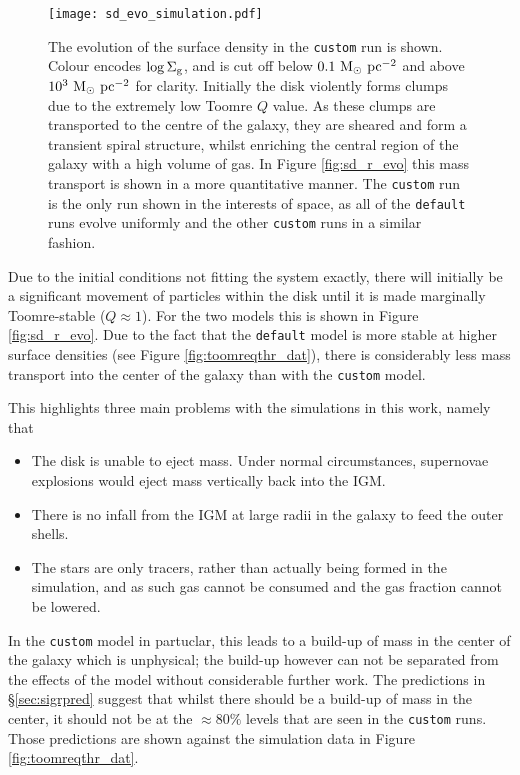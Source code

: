 \begin{figure}[!ht]
    \texttt{[image: sd\_evo\_simulation.pdf]}
    \caption{The evolution of the surface density in the {\tt custom} run is shown. Colour encodes $\log\Sigma_\mathrm{g}$, and is cut off below $0.1 ~\mathrm{M}_{\odot} ~\mathrm{pc}^{-2}$ and above $10^3 ~\mathrm{M}_{\odot} ~\mathrm{pc}^{-2}$ for clarity. Initially the disk violently forms clumps due to the extremely low Toomre $Q$ value. As these clumps are transported to the centre of the galaxy, they are sheared and form a transient spiral structure, whilst enriching the central region of the galaxy with a high volume of gas. In Figure \ref{fig:sd_r_evo} this mass transport is shown in a more quantitative manner. The {\tt custom} run is the only run shown in the interests of space, as all of the {\tt default} runs evolve uniformly and the other {\tt custom} runs in a similar fashion.}
    \label{fig:sd_evo_small}
\end{figure}
Due to the initial conditions not fitting the system exactly, there will initially be a significant movement of particles within the disk until it is made marginally Toomre-stable ($Q\approx1$).
For the two models this is shown in Figure \ref{fig:sd_r_evo}.
Due to the fact that the {\tt default} model is more stable at higher surface densities (see Figure \ref{fig:toomreqthr_dat}), there is considerably less mass transport into the center of the galaxy than with the {\tt custom} model.

This highlights three main problems with the simulations in this work, namely that
\begin{itemize}
    \item The disk is unable to eject mass. Under normal circumstances, supernovae explosions would eject mass vertically back into the IGM.
    \item There is no infall from the IGM at large radii in the galaxy to feed the outer shells.
    \item The stars are only tracers, rather than actually being formed in the simulation, and as such gas cannot be consumed and the gas fraction cannot be lowered.
\end{itemize}
In the {\tt custom} model in partuclar, this leads to a build-up of mass in the center of the galaxy which is unphysical; the build-up however can not be separated from the effects of the model without considerable further work.
The predictions in \S \ref{sec:sigrpred} suggest that whilst there should be a build-up of mass in the center, it should not be at the $\approx 80\%$ levels that are seen in the {\tt custom} runs.
Those predictions are shown against the simulation data in Figure \ref{fig:toomreqthr_dat}.

